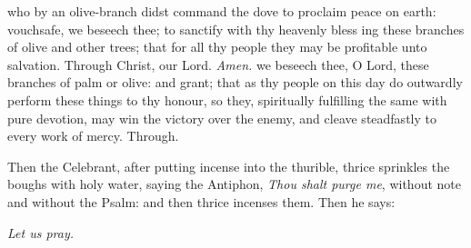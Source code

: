 {} who by an olive-branch didst command the dove to proclaim peace on earth: vouchsafe, we beseech thee; to sanctify with thy heavenly bless {} ing these branches of olive and other trees; that for all thy people they may be profitable unto salvation. Through Christ, our Lord. \textit{Amen.}
{} we beseech thee, O Lord, these branches of palm or olive: and grant; that as thy people on this day do outwardly perform these things to thy honour, so they, spiritually fulfilling the same with pure devotion, may win the victory over the enemy, and cleave steadfastly to every work of mercy. Through.
\begin{rubric}
    Then the Celebrant, after putting incense into the thurible, thrice sprinkles the boughs with holy water, saying the Antiphon, \emph{Thou shalt purge me}, without note and without the Psalm: and then thrice incenses them. Then he says:
\end{rubric}
\centerline{\textit{Let us pray.}}

